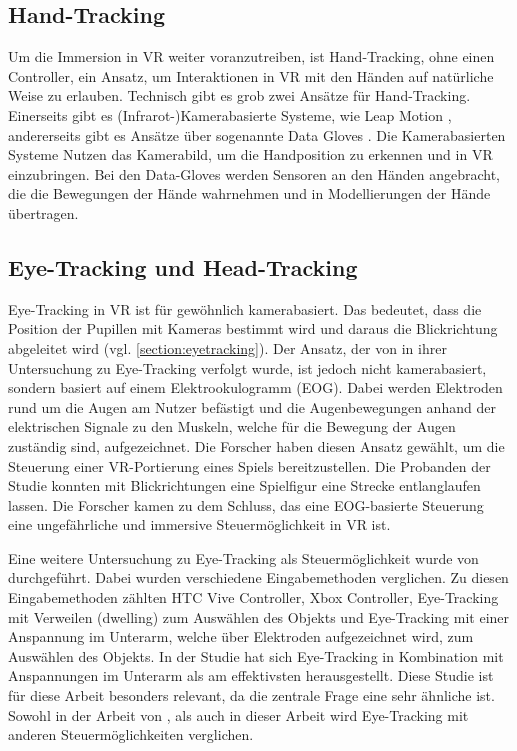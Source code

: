 \subsection{Hand-Tracking}
Um die Immersion in \ac{VR} weiter voranzutreiben, ist Hand-Tracking, ohne einen Controller, ein Ansatz, um Interaktionen in \ac{VR} mit den Händen auf natürliche Weise zu erlauben. 
Technisch gibt es grob zwei Ansätze für Hand-Tracking. Einerseits gibt es (Infrarot-)Kamerabasierte Systeme, wie Leap Motion \cite{Leap.2014}, andererseits gibt es Ansätze über sogenannte Data Gloves \cite{S.Lee.2017}. Die Kamerabasierten Systeme Nutzen das Kamerabild, um die Handposition zu erkennen und in \ac{VR} einzubringen. Bei den Data-Gloves werden Sensoren an den Händen angebracht, die die Bewegungen der Hände wahrnehmen und in Modellierungen der Hände übertragen. 

\subsection{Eye-Tracking und Head-Tracking}
\label{eyetrackingVR}
Eye-Tracking in \ac{VR} ist für gewöhnlich kamerabasiert. Das bedeutet, dass die Position der Pupillen mit Kameras bestimmt wird und daraus die Blickrichtung abgeleitet wird (vgl. \autoref{section:eyetracking})\cite{Blake.2013}. Der Ansatz, der von \citeauthor{D.Kumar.2016} in ihrer Untersuchung zu Eye-Tracking verfolgt wurde, ist jedoch nicht kamerabasiert, sondern basiert auf einem Elektrookulogramm (EOG). Dabei werden Elektroden rund um die Augen am Nutzer befästigt und die Augenbewegungen anhand der elektrischen Signale zu den Muskeln, welche für die Bewegung der Augen zuständig sind, aufgezeichnet. Die Forscher haben diesen Ansatz gewählt, um die Steuerung einer \ac{VR}-Portierung eines Spiels bereitzustellen. Die Probanden der Studie konnten mit Blickrichtungen eine Spielfigur eine Strecke entlanglaufen lassen. Die Forscher kamen zu dem Schluss, das eine EOG-basierte Steuerung eine ungefährliche und immersive Steuermöglichkeit in \ac{VR} ist. \cite{D.Kumar.2016}

Eine weitere Untersuchung zu Eye-Tracking als Steuermöglichkeit wurde von \citeauthor{Pai.2019} durchgeführt. Dabei wurden verschiedene Eingabemethoden verglichen. Zu diesen Eingabemethoden zählten HTC Vive Controller, Xbox Controller, Eye-Tracking mit Verweilen (dwelling) zum Auswählen des Objekts und Eye-Tracking mit einer Anspannung im Unterarm, welche über Elektroden aufgezeichnet wird, zum Auswählen des Objekts. In der Studie hat sich Eye-Tracking in Kombination mit Anspannungen im Unterarm als am effektivsten herausgestellt. \cite{Pai.2019} Diese Studie ist für diese Arbeit besonders relevant, da die zentrale Frage eine sehr ähnliche ist. Sowohl in der Arbeit von \citeauthor{Pai.2019}, als auch in dieser Arbeit wird Eye-Tracking mit anderen Steuermöglichkeiten verglichen.

